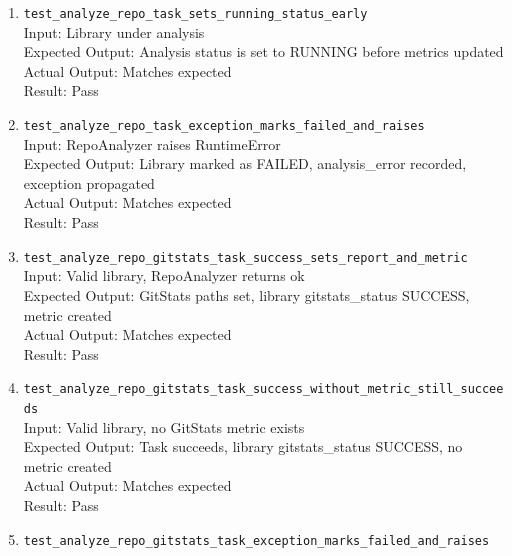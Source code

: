 \documentclass[12pt, titlepage]{article}
\begin{document}
\begin{enumerate}
      \\Input: Valid library, metrics, RepoAnalyzer returns metrics
      \\Expected Output: Updates numeric metrics, marks library analysis as SUCCESS
      \\Actual Output: Matches expected
      \\Result: Pass
    \item \texttt{test\_analyze\_repo\_task\_sets\_running\_status\_early} \label{test-analyze-repo-task-sets-running-status-early}
      \\Input: Library under analysis
      \\Expected Output: Analysis status is set to RUNNING before metrics updated
      \\Actual Output: Matches expected
      \\Result: Pass
    \item \texttt{test\_analyze\_repo\_task\_exception\_marks\_failed\_and\_raises} \label{test-analyze-repo-task-exception-marks-failed-and-raises}
      \\Input: RepoAnalyzer raises RuntimeError
      \\Expected Output: Library marked as FAILED, analysis\_error recorded, exception propagated
      \\Actual Output: Matches expected
      \\Result: Pass
    \item \texttt{test\_analyze\_repo\_gitstats\_task\_success\_sets\_report\_and\_metric} \label{test-analyze-repo-gitstats-task-success-sets-report-and-metric}
      \\Input: Valid library, RepoAnalyzer returns ok
      \\Expected Output: GitStats paths set, library gitstats\_status SUCCESS, metric created
      \\Actual Output: Matches expected
      \\Result: Pass
    \item \texttt{test\_analyze\_repo\_gitstats\_task\_success\_without\_metric\_still\_succeeds} \label{test-analyze-repo-gitstats-task-success-without-metric-still-succeeds}
      \\Input: Valid library, no GitStats metric exists
      \\Expected Output: Task succeeds, library gitstats\_status SUCCESS, no metric created
      \\Actual Output: Matches expected
      \\Result: Pass
    \item \texttt{test\_analyze\_repo\_gitstats\_task\_exception\_marks\_failed\_and\_raises} \label{test-analyze-repo-gitstats-task-exception-marks-failed-and-raises}

\end{enumerate}
\end{document}
